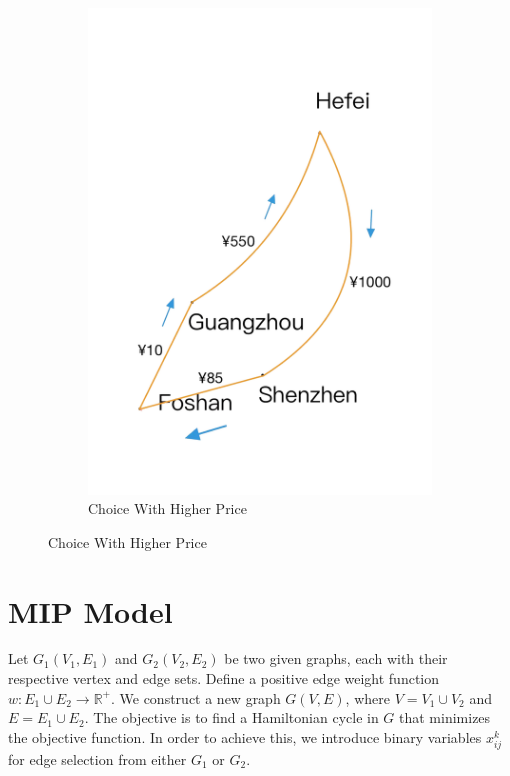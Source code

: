 \documentclass{extarticle}
\begin{document}
\begin{figure}[!ht]
\begin{subfigure}{0.3\textwidth}
      \includegraphics[width=\textwidth]{pic/3.png}
      \caption{Choice With Higher Price}%
\label{fig:your_image3}
  \end{subfigure}%
\end{figure}
\section{MIP Model}
Let $G_1(V_1, E_1)$ and $G_2(V_2, E_2)$ be two given graphs, each with their
respective vertex and edge sets. Define a positive edge weight function $w :
  E_1 \cup E_2 \rightarrow \mathbb{R}^+$. We construct a new graph $G(V, E)$,
where $V = V_1 \cup V_2$ and $E = E_1 \cup E_2$. The objective is to find a
Hamiltonian cycle in $G$ that minimizes the objective function. In order to
achieve this, we introduce binary variables $x_{ij}^k$ for edge selection from
either $G_1$ or $G_2$.
\end{document}
